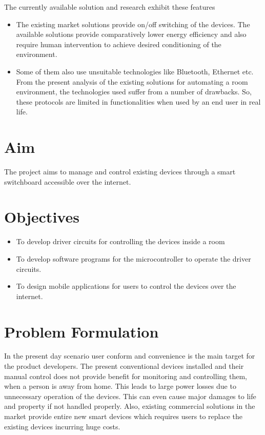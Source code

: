         	The currently available solution and research exhibit these features
        	\begin{itemize}
        		\item The existing market solutions provide on/off switching of the devices. The available solutions provide comparatively lower energy efficiency and also require human intervention to achieve desired conditioning of the environment.
        		\item Some of them also use unsuitable technologies like Bluetooth, Ethernet etc. From the present analysis of the existing solutions for automating a room environment, the technologies used suffer from a number of drawbacks. So, these protocols are limited in functionalities when used by an end user in real life.
        	\end{itemize}
        	
        \section{Aim}
        	The project aims to manage and control existing devices through a smart switchboard accessible over the internet.
        	        \section{Objectives}
	        \begin{itemize}
	        	\item To develop driver circuits for controlling the devices inside a room

                 \item To develop software programs for the microcontroller to operate the driver circuits.

                  \item To design mobile applications for users to control the devices over the internet.
	        	
	        \end{itemize}
        \section{Problem Formulation}
        In the present day scenario user conform and convenience is the main target for the product developers. The present conventional devices installed and their manual control does not provide benefit for monitoring and controlling them, when a person is away from home. This leads to large power losses due to unnecessary operation of the devices. This can even cause major damages to life and property if not handled properly. Also, existing commercial solutions in the market provide entire new smart devices which requires users to replace the existing devices incurring huge costs. 
